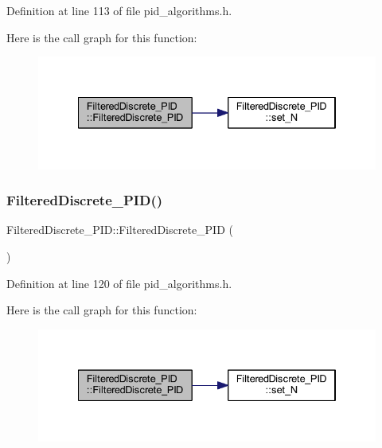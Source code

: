 Definition at line 113 of file pid\+\_\+algorithms.\+h.

Here is the call graph for this function\+:
\nopagebreak
\begin{figure}[H]
\begin{center}
\leavevmode
\includegraphics[width=334pt]{class_filtered_discrete___p_i_d_a9cc44afe9d0209b34c760a2512a6d290_cgraph}
\end{center}
\end{figure}
\mbox{\label{class_filtered_discrete___p_i_d_aaee4ac4ba8f81e22a4fbc68843e4cb79}} 
\subsubsection{\texorpdfstring{FilteredDiscrete\_PID()}{FilteredDiscrete\_PID()}\hspace{0.1cm}{\footnotesize\ttfamily [2/4]}}
{\footnotesize\ttfamily Filtered\+Discrete\+\_\+\+P\+I\+D\+::\+Filtered\+Discrete\+\_\+\+P\+ID (\begin{DoxyParamCaption}{ }\end{DoxyParamCaption})\hspace{0.3cm}{\ttfamily [inline]}}



Definition at line 120 of file pid\+\_\+algorithms.\+h.

Here is the call graph for this function\+:
\nopagebreak
\begin{figure}[H]
\begin{center}
\leavevmode
\includegraphics[width=334pt]{class_filtered_discrete___p_i_d_aaee4ac4ba8f81e22a4fbc68843e4cb79_cgraph}
\end{center}
\end{figure}
\mbox{\label{class_filtered_discrete___p_i_d_a6158e91cc05d56a14f5f2fdc73ede339}} 
